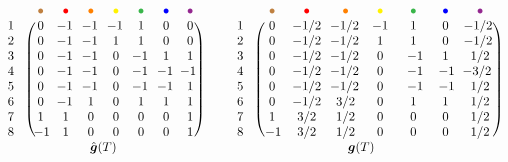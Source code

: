 \(
\begin{blockarray}{ccccccccc}
	& & {\color{brown} \bullet} & {\color{red} \bullet} & {\color{orange} \bullet} & {\color{yellow} \bullet} & {\color{green} \bullet} & {\color{blue} \bullet} & {\color{violet} \bullet} \\
	\begin{block}{c@{\hspace*{-.1cm}}c(ccccccc)}
	1 & & 0 & \!\! -1 \!\! & \!\! -1 \!\! & \!\! -1 \!\! & 1 & 0 & 0 \\
	2 & & 0 & \!\! -1 \!\! & \!\! -1 \!\! & 1 & 1 & 0 & 0 \\
	3 & & 0 & \!\! -1 \!\! & \!\! -1 \!\! & 0 & \!\! -1 \!\! & 1 & 1 \\
	4 & & 0 & \!\! -1 \!\! & \!\! -1 \!\! & 0 & \!\! -1 \!\! & \!\! -1 \!\! & \!\!\! -1 \! \\
	5 & & 0 & \!\! -1 \!\! & \!\! -1 \!\! & 0 & \!\! -1 \!\! & \!\! -1 \!\! & 1 \\
	6 & & 0 & \!\! -1 \!\! & 1 & 0 & 1 & 1 & 1 \\
	7 & & 1 & 1 & 0 & 0 & 0 & 0 & 1 \\
	8 & & \! -1 \!\!\! & 1 & 0 & 0 & 0 & 0 & 1 \\
	\end{block}
	& & & & \multicolumn{2}{c}{$\hat{\b{g}}(T)$} & &
\end{blockarray}
%
\qquad
%
\begin{blockarray}{ccccccccc}
	& & {\color{brown} \bullet} & {\color{red} \bullet} & {\color{orange} \bullet} & {\color{yellow} \bullet} & {\color{green} \bullet} & {\color{blue} \bullet} & {\color{violet} \bullet} \\
	\begin{block}{c@{\hspace*{-.1cm}}c(ccccccc)}
	1 & & 0 & \! -1/2 \!\! & \!\! -1/2 \!\! & -1 & 1 & 0 & \!\! -1/2 \\
	2 & & 0 & \! -1/2 \!\! & \!\! -1/2 \!\! & 1 & 1 & 0 & \!\! -1/2 \\
	3 & & 0 & \! -1/2 \!\! & \!\! -1/2 \!\! & 0 & \; -1 \; & 1 & 1/2 \\
	4 & & 0 & \! -1/2 \!\! & \!\! -1/2 \!\! & 0 & \; -1 \; & -1\!\! & \!\!\! -3/2 \\
	5 & & 0 & \! -1/2 \!\! & \!\! -1/2 \!\! & 0 & \; -1 \; & -1 \!\! & 1/2 \\
	6 & & 0 & \! -1/2 \!\! & 3/2 & 0 & 1 & 1 & 1/2 \\
	7 & & 1 & 3/2 & 1/2 & 0 & 0 & 0 & 1/2 \\
	8 & & -1 \!\! & 3/2 & 1/2 & 0 & 0 & 0 & 1/2 \\
	\end{block}
	& & & & \multicolumn{2}{c}{$\b{g}(T)$} & &
\end{blockarray}
\)